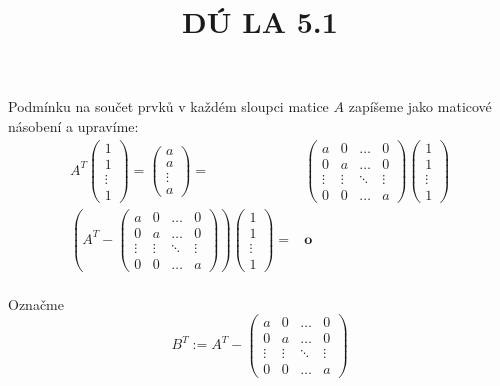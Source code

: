 \documentclass[11pt]{article}
\title{DÚ LA 5.1}
\date{}
\begin{document}
\maketitle
\paragraph{} Podmínku na součet prvků v každém sloupci matice $A$ zapíšeme jako maticové násobení a upravíme:
\begin{align*}
A^T\begin{pmatrix}
1\\1\\\vdots\\1
\end{pmatrix}=\begin{pmatrix}
a\\a\\\vdots\\a
\end{pmatrix}=&\begin{pmatrix}
  a      & 0      & \dots  & 0      \\
  0      & a      & \dots  & 0      \\
  \vdots & \vdots & \ddots & \vdots \\
  0      & 0      & \dots  & a
\end{pmatrix}\begin{pmatrix}
1\\1\\\vdots\\1
\end{pmatrix}\\
\left(A^T-\begin{pmatrix}
  a      & 0      & \dots  & 0      \\
  0      & a      & \dots  & 0      \\
  \vdots & \vdots & \ddots & \vdots \\
  0      & 0      & \dots  & a
\end{pmatrix}\right)\begin{pmatrix}
1\\1\\\vdots\\1
\end{pmatrix}=&\textbf{o}
\end{align*}
\paragraph*{} Označme
\[
B^T:=A^T-\begin{pmatrix}
  a      & 0      & \dots  & 0      \\
  0      & a      & \dots  & 0      \\
  \vdots & \vdots & \ddots & \vdots \\
  0      & 0      & \dots  & a
\end{pmatrix}
\]
\end{document}

